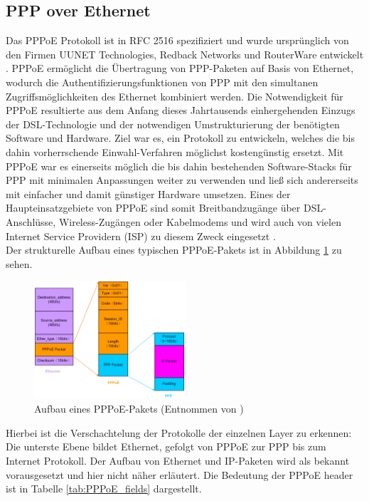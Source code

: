 \documentclass[journal,11pt]{IEEEtran}
\begin{document}
\subsection{PPP over Ethernet}
Das PPPoE Protokoll ist in RFC 2516 spezifiziert und wurde ursprünglich
von den Firmen UUNET Technologies, Redback Networks und RouterWare entwickelt \cite{RFC2516}.
PPPoE ermöglicht die Übertragung von PPP-Paketen auf Basis von Ethernet, wodurch
die Authentifizierungsfunktionen von PPP mit den
simultanen Zugriffsmöglichkeiten des Ethernet kombiniert werden.
Die Notwendigkeit für PPPoE resultierte aus dem Anfang dieses Jahrtausends
einhergehenden Einzugs der DSL-Technologie und der notwendigen Umstrukturierung
der benötigten Software und Hardware. Ziel war es, ein Protokoll zu entwickeln,
welches die bis dahin vorherrschende Einwahl-Verfahren möglichst kostengünstig
ersetzt. Mit PPPoE war es einerseits möglich die bis dahin bestehenden Software-Stacks für PPP
mit minimalen Anpassungen weiter zu verwenden und ließ sich andererseits mit einfacher
und damit günstiger Hardware umsetzen\cite{dslapp}.
Eines der Haupteinsatzgebiete von PPPoE sind somit Breitbandzugänge über DSL-Anschlüsse,
Wireless-Zugängen oder Kabelmodems und wird
auch von vielen Internet Service Providern (ISP) zu diesem Zweck eingesetzt \cite[p.88]{cisconut}.\\
%
Der strukturelle Aufbau eines typischen PPPoE-Pakets ist in Abbildung \ref{fig:PPPoE_Bild} zu sehen.
\begin{figure}[h!]
 \centering
  \includegraphics[width=0.5\textwidth]{img/pppoe_aufbau.jpg}
 \caption{Aufbau eines PPPoE-Pakets (Entnommen von \cite{pppoe_h3c})}
 \label{fig:PPPoE_Bild}
\end{figure}
Hierbei ist die Verschachtelung der Protokolle der einzelnen Layer zu erkennen: Die unterste
Ebene bildet Ethernet, gefolgt von PPPoE zur PPP bis zum Internet Protokoll.
Der Aufbau von Ethernet und IP-Paketen wird als bekannt vorausgesetzt und hier nicht näher erläutert.
Die Bedeutung der PPPoE header ist in Tabelle \ref{tab:PPPoE_fields} dargestellt.
\end{document}
